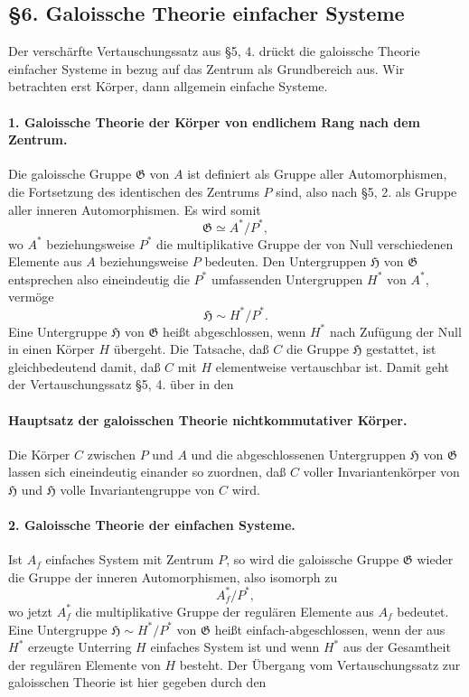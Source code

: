 \documentclass[11pt]{article}
\providecommand{\Gcal}{\mathfrak G}
\begin{document}
\clearpage

\subsection*{§6. Galoissche Theorie einfacher Systeme}

Der verschärfte Vertauschungssatz aus §5, 4. drückt die galoissche Theorie einfacher Systeme in bezug auf das Zentrum als Grundbereich aus. Wir betrachten erst Körper, dann allgemein einfache Systeme.

\paragraph{1. Galoissche Theorie der Körper von endlichem Rang nach dem Zentrum.}
Die galoissche Gruppe \(\Gcal\) von \(A\) ist definiert als Gruppe aller Automorphismen, die Fortsetzung des identischen des Zentrums \(P\) sind, also nach §5, 2. als Gruppe aller inneren Automorphismen. Es wird somit
\[
        \Gcal \simeq A^*/P^*,
\]
wo \(A^*\) beziehungsweise \(P^*\) die multiplikative Gruppe der von Null verschiedenen Elemente aus \(A\) beziehungsweise \(P\) bedeuten. Den Untergruppen \(\mathfrak H\) von \(\Gcal\) entsprechen also eineindeutig die \(P^*\) umfassenden Untergruppen \(H^*\) von \(A^*\), vermöge
\[
        \mathfrak H \sim H^*/P^* .
\]
Eine Untergruppe \(\mathfrak H\) von \(\Gcal\) heißt abgeschlossen, wenn \(H^*\) nach Zufügung der Null in einen Körper \(H\) übergeht. Die Tatsache, daß \(C\) die Gruppe \(\mathfrak H\) gestattet, ist gleichbedeutend damit, daß \(C\) mit \(H\) elementweise vertauschbar ist. Damit geht der Vertauschungssatz §5, 4. über in den

\paragraph{Hauptsatz der galoisschen Theorie nichtkommutativer Körper.}
Die Körper \(C\) zwischen \(P\) und \(A\) und die abgeschlossenen Untergruppen \(\mathfrak H\) von \(\Gcal\) lassen sich eineindeutig einander so zuordnen, daß \(C\) voller Invariantenkörper von \(\mathfrak H\) und \(\mathfrak H\) volle Invariantengruppe von \(C\) wird.

\paragraph{2. Galoissche Theorie der einfachen Systeme.}
Ist \(A_f\) einfaches System mit Zentrum \(P\), so wird die galoissche Gruppe \(\Gcal\) wieder die Gruppe der inneren Automorphismen, also isomorph zu
\[
        A_f^*/P^*,
\]
wo jetzt \(A_f^*\) die multiplikative Gruppe der regulären Elemente aus \(A_f\) bedeutet. Eine Untergruppe \(\mathfrak H\sim H^*/P^*\) von \(\Gcal\) heißt einfach-abgeschlossen, wenn der aus \(H^*\) erzeugte Unterring \(H\) einfaches System ist und wenn \(H^*\) aus der Gesamtheit der regulären Elemente von \(H\) besteht. Der Übergang vom Vertauschungssatz zur galoisschen Theorie ist hier gegeben durch den
\end{document}
